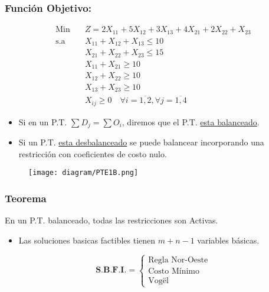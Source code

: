 \documentclass{templateNote}
\begin{document}
\subsubsection*{Función Objetivo:}
\begin{equation*}
    \begin{aligned}
        \text{Min} \quad & Z = 2X_{11} + 5X_{12} + 3X_{13} + 4X_{21} + 2X_{22} + X_{23}\\
        \text{s.a} \quad & X_{11} + X_{12} + X_{13} \leq 10 \\
        & X_{21} + X_{22} + X_{23} \leq 15 \\
        & X_{11} + X_{21} \geq 10 \\
        & X_{12} + X_{22} \geq 10 \\
        & X_{13} + X_{23} \geq 10 \\
        & X_{ij} \geq 0 \quad \forall i = \overline{1,2}, \forall j = \overline{1,4}
    \end{aligned}
\end{equation*}
\begin{itemize}
    \item Si en un P.T. $\sum{D_j} = \sum{O_i}$, diremos que el P.T. \underline{esta balanceado}.
\end{itemize}

\newpage
\begin{itemize}
    \item Si un P.T. \underline{esta desbalanceado} se puede balancear incorporando una restricción con coeficientes de costo nulo.
\end{itemize}
\begin{figure}[H]
    \centering
    \texttt{[image: diagram/PTE1B.png]}
\end{figure}

\subsubsection*{Teorema}
En un P.T. balanceado, todas las restricciones son Activas.
\begin{itemize}
    \item Las soluciones basicas factibles tienen $m+n-1$ variables básicas.
\end{itemize}

\begin{equation*}
    \textbf{S.B.F.I.} = \left\{
        \begin{array}{l} \text{Regla Nor-Oeste} \\
            \text{Costo Mínimo} \\
            \text{Vogël}
        \end{array}
    \right.
\end{equation*}
\end{document}
